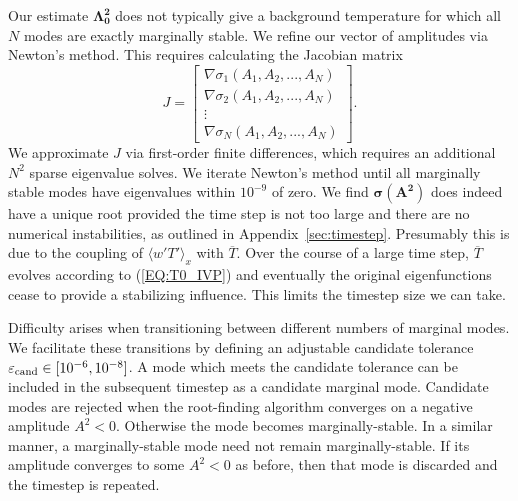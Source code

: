 \documentclass[reprint,amsmath,amssymb,aps,nofootinbib]{revtex4-1}
\renewcommand{\vec}[1]{\boldsymbol{#1}}
\newcommand{\eq}[1]{(\ref{#1})}
\begin{document}
Our estimate $\vec{\Lambda^2_0}$ does not typically give a background temperature for which all $N$ modes are exactly marginally stable.
We refine our vector of amplitudes via Newton's method.
This requires calculating the Jacobian matrix 
\begin{equation}
    J = \begin{bmatrix}
        \nabla \sigma_1 (A_1, A_2, ..., A_N) \\
        \nabla \sigma_2 (A_1, A_2, ..., A_N) \\
        \vdots \\
        \nabla \sigma_N (A_1, A_2, ..., A_N) 
    \end{bmatrix}.
\end{equation}
We approximate $J$ via first-order finite differences, which requires an additional $N^2$ sparse eigenvalue solves.
We iterate Newton's method until all marginally stable modes have eigenvalues within $10^{-9}$ of zero.
We find $\vec{\sigma}(\vec{A^2})$ does indeed have a unique root provided the time step is not too large and there are no numerical instabilities, as outlined in Appendix~\ref{sec:timestep}.
Presumably this is due to the coupling of $\langle w'T' \rangle_x$ with $\overline{T}$.
Over the course of a large time step, $\overline{T}$ evolves according to \eq{EQ:T0_IVP} and eventually the original eigenfunctions cease to provide a stabilizing influence.
This limits the timestep size we can take.

Difficulty arises when transitioning between different numbers of marginal modes.
We facilitate these transitions by defining an adjustable candidate tolerance $\varepsilon_{\rm{cand}} \in [10^{-6}, 10^{-8}]$.
A mode which meets the candidate tolerance can be included in the subsequent timestep as a candidate marginal mode.
Candidate modes are rejected when the root-finding algorithm converges on a negative amplitude $A^2 < 0$.
Otherwise the mode becomes marginally-stable.
In a similar manner, a marginally-stable mode need not remain marginally-stable.
If its amplitude converges to some $A^2 < 0$ as before, then that mode is discarded and the timestep is repeated.
\end{document}
